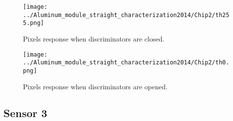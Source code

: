 \documentclass[a4papper, 11pt]{article}
\begin{document}
        \begin{figure}[!h]
            \centering
            \texttt{[image: ../Aluminum\_module\_straight\_characterization2014/Chip2/th255.png]}
            \caption{Pixels response when discriminators are closed.}
        \end{figure}
    \FloatBarrier 

        \begin{figure}[!h]
            \centering
            \texttt{[image: ../Aluminum\_module\_straight\_characterization2014/Chip2/th0.png]}
            \caption{Pixels response when discriminators are opened.}
        \end{figure}
    \FloatBarrier 


      \subsection{Sensor 3}
\end{document}
